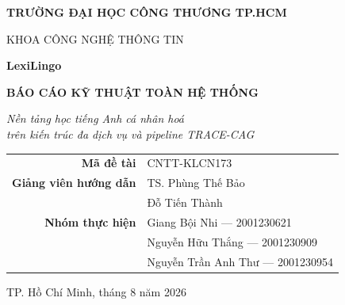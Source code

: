 \documentclass[12pt,a4paper,oneside]{report}
\begin{document}
\begin{titlepage}
\centering
\vspace*{1.5cm}
{\large\bfseries TRƯỜNG ĐẠI HỌC CÔNG THƯƠNG TP.HCM\par}
{\large KHOA CÔNG NGHỆ THÔNG TIN\par}
\vspace{2.5cm}
{\Huge\bfseries\color{lexiblue} LexiLingo\par}
\vspace{0.6cm}
{\LARGE\bfseries BÁO CÁO KỸ THUẬT TOÀN HỆ THỐNG\par}
\vspace{0.8cm}
{\large\itshape Nền tảng học tiếng Anh cá nhân hoá\\ trên kiến trúc đa dịch vụ và pipeline TRACE-CAG\par}
\vspace{2.2cm}

\begin{tabular}{rl}
\textbf{Mã đề tài} & CNTT-KLCN173\\
\textbf{Giảng viên hướng dẫn} & TS. Phùng Thế Bảo\\
 & Đỗ Tiến Thành\\
\textbf{Nhóm thực hiện} & Giang Bội Nhi — 2001230621\\
 & Nguyễn Hữu Thắng — 2001230909\\
 & Nguyễn Trần Anh Thư — 2001230954\\
\end{tabular}

\vfill
{\large TP. Hồ Chí Minh, tháng 8 năm 2026\par}
\end{titlepage}

\tableofcontents
\cleardoublepage
















\end{document}
